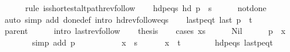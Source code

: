 \begin{isabellebody}
\ \ \ \ \ \ {\isacharparenleft}{\kern0pt}rule\ is{\isacharunderscore}{\kern0pt}shortest{\isacharunderscore}{\kern0pt}alt{\isacharunderscore}{\kern0pt}path{\isacharunderscore}{\kern0pt}rev{\isacharunderscore}{\kern0pt}follow{\isacharparenright}{\kern0pt}\isanewline
\ \ \isamarkupfalse%
\ hd{\isacharunderscore}{\kern0pt}p{\isacharunderscore}{\kern0pt}eq{\isacharunderscore}{\kern0pt}s{\isacharcolon}{\kern0pt}\ {\isachardoublequoteopen}hd\ {\isacharquery}{\kern0pt}p\ {\isacharequal}{\kern0pt}\ s{\isachardoublequoteclose}\isanewline
\ \ \ \ \isamarkupfalse%
\ not{\isacharunderscore}{\kern0pt}done{\isacharunderscore}{\kern0pt}{}\isanewline
\ \ \ \ \isamarkupfalse%
\ {\isacharparenleft}{\kern0pt}auto\ simp\ add{\isacharcolon}{\kern0pt}\ done{\isacharunderscore}{\kern0pt}{}{\isacharunderscore}{\kern0pt}def\ intro{\isacharcolon}{\kern0pt}\ hd{\isacharunderscore}{\kern0pt}rev{\isacharunderscore}{\kern0pt}follow{\isacharunderscore}{\kern0pt}eq{\isacharunderscore}{\kern0pt}s{\isacharparenright}{\kern0pt}\isanewline
\ \ \isamarkupfalse%
\ last{\isacharunderscore}{\kern0pt}p{\isacharunderscore}{\kern0pt}eq{\isacharunderscore}{\kern0pt}t{\isacharcolon}{\kern0pt}\ {\isachardoublequoteopen}last\ {\isacharquery}{\kern0pt}p\ {\isacharequal}{\kern0pt}\ t{\isachardoublequoteclose}\isanewline
\ \ \ \ \isamarkupfalse%
\ parent\isanewline
\ \ \ \ \isamarkupfalse%
\ {\isacharparenleft}{\kern0pt}intro\ last{\isacharunderscore}{\kern0pt}rev{\isacharunderscore}{\kern0pt}follow{\isacharparenright}{\kern0pt}\isanewline
\ \ \isamarkupfalse%
\ {\isacharquery}{\kern0pt}thesis\isanewline
\ \ \isamarkupfalse%
\ {\isacharparenleft}{\kern0pt}cases\ xs{\isacharparenright}{\kern0pt}\isanewline
\ \ \ \ \isamarkupfalse%
\ Nil\isanewline
\ \ \ \ \isamarkupfalse%
\ {\isachardoublequoteopen}{\isacharquery}{\kern0pt}p\ {\isacharequal}{\kern0pt}\ {\isacharbrackleft}{\kern0pt}x{\isacharbrackright}{\kern0pt}{\isachardoublequoteclose}\isanewline
\ \ \ \ \ \ \isamarkupfalse%
\ {\isacharparenleft}{\kern0pt}simp\ add{\isacharcolon}{\kern0pt}\ p{\isacharparenright}{\kern0pt}\isanewline
\ \ \ \ \isamarkupfalse%
\isanewline
\ \ \ \ \ \ {\isachardoublequoteopen}x\ {\isacharequal}{\kern0pt}\ s{\isachardoublequoteclose}\isanewline
\ \ \ \ \ \ {\isachardoublequoteopen}x\ {\isacharequal}{\kern0pt}\ t{\isachardoublequoteclose}\isanewline
\ \ \ \ \ \ \isamarkupfalse%
\ hd{\isacharunderscore}{\kern0pt}p{\isacharunderscore}{\kern0pt}eq{\isacharunderscore}{\kern0pt}s\ last{\isacharunderscore}{\kern0pt}p{\isacharunderscore}{\kern0pt}eq{\isacharunderscore}{\kern0pt}t\isanewline

\end{isabellebody}
